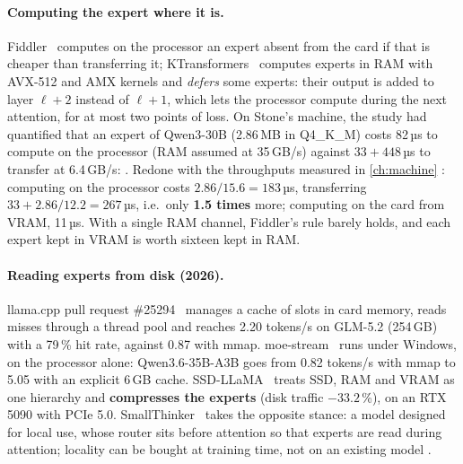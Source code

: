 \paragraph{Computing the expert where it is.} Fiddler~\cite{fiddler2025} computes on the processor an expert absent from the card if that is cheaper than transferring it; KTransformers~\cite{ktransformers2025} computes experts in RAM with AVX-512 and AMX kernels and \emph{defers} some experts: their output is added to layer $\ell+2$ instead of $\ell+1$, which lets the processor compute during the next attention, for at most two points of loss. On Stone's machine, the study had quantified that an expert of Qwen3-30B (2.86\,MB in Q4\_K\_M) costs 82\,µs to compute on the processor (RAM assumed at 35\,GB/s) against $33 + 448$\,µs to transfer at 6.4\,GB/s: . Redone with the throughputs measured in \cref{ch:machine} \calc: computing on the processor costs $2.86/15.6 = 183$\,µs, transferring $33 + 2.86/12.2 = 267$\,µs, i.e.\ only \textbf{1.5 times} more; computing on the card from VRAM, 11\,µs. With a single RAM channel, Fiddler's rule barely holds, and each expert kept in VRAM is worth sixteen kept in RAM.

\paragraph{Reading experts from disk (2026).} llama.cpp pull request \#25294~\cite{llamapr25294} manages a cache of slots in card memory, reads misses through a thread pool and reaches 2.20 tokens/s on GLM-5.2 (254\,GB) with a 79\,\% hit rate, against 0.87 with mmap. moe-stream~\cite{moestream2026} runs under Windows, on the processor alone: Qwen3.6-35B-A3B goes from 0.82 tokens/s with mmap to 5.05 with an explicit 6\,GB cache. SSD-LLaMA~\cite{ssdllama2026} treats SSD, RAM and VRAM as one hierarchy and \textbf{compresses the experts} (disk traffic $-33.2$\,\%), on an RTX 5090 with PCIe 5.0. SmallThinker~\cite{smallthinker2025} takes the opposite stance: a model designed for local use, whose router sits before attention so that experts are read during attention; locality can be bought at training time, not on an existing model \litt.


